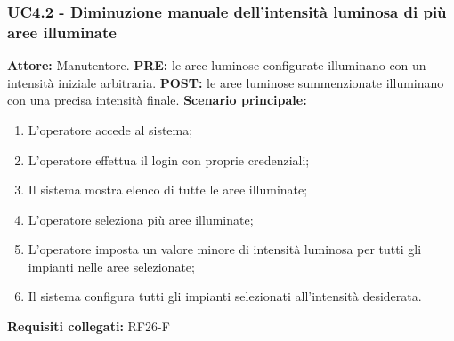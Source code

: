 \documentclass[a4paper, 12pt]{article}
\begin{document}
\subsubsection{UC4.2 - Diminuzione manuale dell'intensità luminosa di più aree illuminate}
\textbf{Attore:} Manutentore.\newline
\textbf{PRE:} le aree luminose configurate illuminano con un intensità iniziale arbitraria.\newline
\textbf{POST:} le aree luminose summenzionate illuminano con una precisa intensità finale.\newline
\textbf{Scenario principale:}
\begin{enumerate}
    \item L'operatore accede al sistema;
    \item L'operatore effettua il login con proprie credenziali;
    \item Il sistema mostra elenco di tutte le aree illuminate;
    \item L'operatore seleziona più aree illuminate;
    \item L'operatore imposta un valore minore di intensità luminosa per tutti gli impianti nelle aree selezionate;
    \item Il sistema configura tutti gli impianti selezionati all'intensità desiderata.
\end{enumerate}
\textbf{Requisiti collegati:} RF26-F\newline
\end{document}
